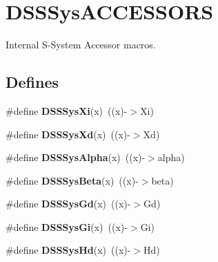 \hypertarget{group___d_s_s_sys_a_c_c_e_s_s_o_r_s}{
\section{DSSSysACCESSORS}
\label{group___d_s_s_sys_a_c_c_e_s_s_o_r_s}
}


Internal S-\/System Accessor macros.  


\subsection*{Defines}
\begin{DoxyCompactItemize}
\item 
\hypertarget{group___d_s_s_sys_a_c_c_e_s_s_o_r_s_gaee5dae8a8fe25a8d87bccff13f2cf17e}{
\#define {\bfseries DSSSysXi}(x)~((x)-\/$>$Xi)}
\label{group___d_s_s_sys_a_c_c_e_s_s_o_r_s_gaee5dae8a8fe25a8d87bccff13f2cf17e}

\item 
\hypertarget{group___d_s_s_sys_a_c_c_e_s_s_o_r_s_ga4c50ec977327df62c43f45b8b7b44c7e}{
\#define {\bfseries DSSSysXd}(x)~((x)-\/$>$Xd)}
\label{group___d_s_s_sys_a_c_c_e_s_s_o_r_s_ga4c50ec977327df62c43f45b8b7b44c7e}

\item 
\hypertarget{group___d_s_s_sys_a_c_c_e_s_s_o_r_s_ga5b60391833e8fc7ff77aa3f0227fbb62}{
\#define {\bfseries DSSSysAlpha}(x)~((x)-\/$>$alpha)}
\label{group___d_s_s_sys_a_c_c_e_s_s_o_r_s_ga5b60391833e8fc7ff77aa3f0227fbb62}

\item 
\hypertarget{group___d_s_s_sys_a_c_c_e_s_s_o_r_s_ga45b8ff37c6cb470e657f9d047f3848d1}{
\#define {\bfseries DSSSysBeta}(x)~((x)-\/$>$beta)}
\label{group___d_s_s_sys_a_c_c_e_s_s_o_r_s_ga45b8ff37c6cb470e657f9d047f3848d1}

\item 
\hypertarget{group___d_s_s_sys_a_c_c_e_s_s_o_r_s_gaac0932569e269f5a6a30567118b99f1c}{
\#define {\bfseries DSSSysGd}(x)~((x)-\/$>$Gd)}
\label{group___d_s_s_sys_a_c_c_e_s_s_o_r_s_gaac0932569e269f5a6a30567118b99f1c}

\item 
\hypertarget{group___d_s_s_sys_a_c_c_e_s_s_o_r_s_gadf9bf19af8323aa08ba7c494f4afd6d5}{
\#define {\bfseries DSSSysGi}(x)~((x)-\/$>$Gi)}
\label{group___d_s_s_sys_a_c_c_e_s_s_o_r_s_gadf9bf19af8323aa08ba7c494f4afd6d5}

\item 
\hypertarget{group___d_s_s_sys_a_c_c_e_s_s_o_r_s_gaa4ab241e12278393cb24b4b4223c8d26}{
\#define {\bfseries DSSSysHd}(x)~((x)-\/$>$Hd)}
\label{group___d_s_s_sys_a_c_c_e_s_s_o_r_s_gaa4ab241e12278393cb24b4b4223c8d26}


\end{DoxyCompactItemize}
